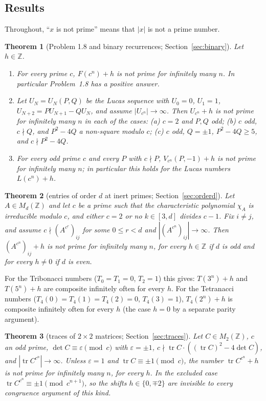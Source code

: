 \documentclass[11pt]{amsart}
\newtheorem{theorem}{Theorem}[section]
\theoremstyle{definition}
\newcommand{\Z}{\mathbb{Z}}
\newcommand{\tr}{\operatorname{tr}}
\begin{document}
\subsection*{Results}
Throughout, ``$x$ is not prime'' means that $|x|$ is not a prime number.

\begin{theorem}[Problem 1.8 and binary recurrences; Section~\ref{sec:binary}]\label{thm:binary}
Let $h\in\Z$.
\begin{enumerate}
\item For every prime $c$, $F(c^n)+h$ is not prime for infinitely many $n$.  In particular Problem~1.8 has a positive answer.
\item Let $U_N=U_N(P,Q)$ be the Lucas sequence with $U_0=0$, $U_1=1$, $U_{N+2}=PU_{N+1}-QU_N$, and assume $|U_{c^n}|\to\infty$.  Then $U_{c^n}+h$ is not prime for infinitely many $n$ in each of the cases: (a) $c=2$ and $P,Q$ odd; (b) $c$ odd, $c\nmid Q$, and $P^2-4Q$ a non-square modulo $c$; (c) $c$ odd, $Q=\pm1$, $P^2-4Q\ge5$, and $c\nmid P^2-4Q$.
\item For every odd prime $c$ and every $P$ with $c\nmid P$, $V_{c^n}(P,-1)+h$ is not prime for infinitely many $n$; in particular this holds for the Lucas numbers $L(c^n)+h$.
\end{enumerate}
\end{theorem}

\begin{theorem}[entries of order $d$ at inert primes; Section~\ref{sec:orderd}]\label{thm:A}
Let $A\in M_d(\Z)$ and let $c$ be a prime such that the characteristic polynomial $\chi_A$ is irreducible modulo $c$, and either $c=2$ or no $k\in[3,d]$ divides $c-1$.  Fix $i\neq j$, and assume $c\nmid (A^{c^r})_{ij}$ for some $0\le r<d$ and $|(A^{c^n})_{ij}|\to\infty$.  Then $(A^{c^n})_{ij}+h$ is not prime for infinitely many $n$, for every $h\in\Z$ if $d$ is odd and for every $h\neq0$ if $d$ is even.
\end{theorem}

For the Tribonacci numbers ($T_0=T_1=0$, $T_2=1$) this gives: $T(3^n)+h$ and $T(5^n)+h$ are composite infinitely often for every $h$.  For the Tetranacci numbers ($T_4(0)=T_4(1)=T_4(2)=0$, $T_4(3)=1$), $T_4(2^n)+h$ is composite infinitely often for every $h$ (the case $h=0$ by a separate parity argument).

\begin{theorem}[traces of $2\times2$ matrices; Section~\ref{sec:traces}]\label{thm:B}
Let $C\in M_2(\Z)$, $c$ an odd prime, $\det C\equiv\varepsilon\pmod c$ with $\varepsilon=\pm1$, $c\nmid \tr C\cdot((\tr C)^2-4\det C)$, and $|\tr C^{c^n}|\to\infty$.  Unless $\varepsilon=1$ and $\tr C\equiv\pm1\pmod c$, the number $\tr C^{c^n}+h$ is not prime for infinitely many $n$, for every $h$.  In the excluded case $\tr C^{c^n}\equiv\pm1\pmod{c^{n+1}}$, so the shifts $h\in\{0,\mp2\}$ are invisible to every congruence argument of this kind.
\end{theorem}
\end{document}
